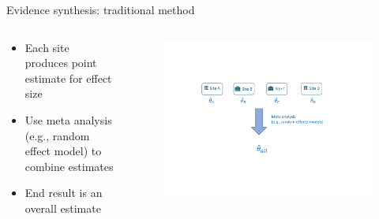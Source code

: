 \documentclass[aspectratio=169,xcolor=dvipsnames]{beamer}					%
\begin{document}
{
\begin{frame}{Evidence synthesis: traditional method}
\begin{columns}
\begin{column}{0.35\textwidth}
\begin{itemize}
    \item Each site produces point estimate for effect size
    \item Use meta analysis (e.g., random effect model) to combine estimates
    \item End result is an overall estimate
\end{itemize}

\end{column}
\begin{column}{0.65\textwidth}
\begin{figure}
    \centering
    \hspace*{-0.15in}
    \includegraphics[trim = 0.5in 1in 0.5in 1.2in, clip, width=1.2\textwidth,page=1]{figures/Legend_hightlight_method_graphs.pdf}
\end{figure}
\end{column}
\end{columns}


\end{frame}
}
\end{document}
